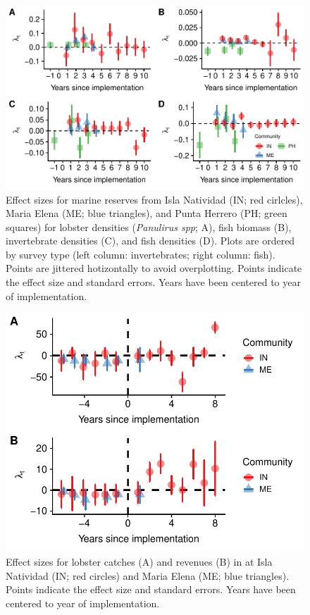 \documentclass{frontiersSCNS}
\theoremstyle{definition}
\theoremstyle{definition}
\theoremstyle{definition}
\theoremstyle{remark}
\begin{document}
\begin{figure}
\centering
\includegraphics{Villasenor-Derbez_files/figure-latex/unnamed-chunk-8-1.pdf}
\caption{\label{fig:unnamed-chunk-8}\label{fig:indicators}Effect sizes for
marine reserves from Isla Natividad (IN; red cirlcles), Maria Elena (ME;
blue triangles), and Punta Herrero (PH; green squares) for lobster
densities (\emph{Panulirus spp}; A), fish biomass (B), invertebrate
densities (C), and fish densities (D). Plots are ordered by survey type
(left column: invertebrates; right column: fish). Points are jittered
hotizontally to avoid overplotting. Points indicate the effect size and
standard errors. Years have been centered to year of implementation.}
\end{figure}

\begin{figure}
\centering
\includegraphics{Villasenor-Derbez_files/figure-latex/unnamed-chunk-9-1.pdf}
\caption{\label{fig:unnamed-chunk-9}\label{fig:lobsters}Effect sizes for
lobster catches (A) and revenues (B) in at Isla Natividad (IN; red
circles) and Maria Elena (ME; blue triangles). Points indicate the
effect size and standard errors. Years have been centered to year of
implementation.}
\end{figure}
\end{document}
